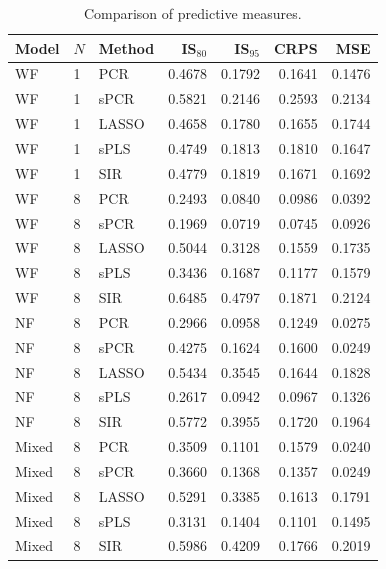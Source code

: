 \documentclass[12pt]{amsart}
\theoremstyle{plain}
\theoremstyle{definition}
\theoremstyle{remark}
\begin{document}
\begin{table}
\centering
\begin{tabular}{lll|rrr|r}
  \toprule
  \textbf{Model} & $N$ & \textbf{Method} & IS$_{80}$ & IS$_{95}$ & CRPS & MSE \\ 
  \midrule
  WF & 1 & PCR & 0.4678 & 0.1792 & 0.1641 & 0.1476 \\ 
  WF & 1 & sPCR & 0.5821 & 0.2146 & 0.2593 & 0.2134 \\ 
  WF & 1 & LASSO & 0.4658 & 0.1780 & 0.1655 & 0.1744 \\ 
  WF & 1 & sPLS & 0.4749 & 0.1813 & 0.1810 & 0.1647 \\ 
  WF & 1 & SIR & 0.4779 & 0.1819 & 0.1671 & 0.1692 \\
  \midrule
  WF & 8 & PCR & 0.2493 & 0.0840 & 0.0986 & 0.0392 \\ 
  WF & 8 & sPCR & 0.1969 & 0.0719 & 0.0745 & 0.0926 \\ 
  WF & 8 & LASSO & 0.5044 & 0.3128 & 0.1559 & 0.1735 \\ 
  WF & 8 & sPLS & 0.3436 & 0.1687 & 0.1177 & 0.1579 \\ 
  WF & 8 & SIR & 0.6485 & 0.4797 & 0.1871 & 0.2124 \\
  \midrule
  NF & 8 & PCR & 0.2966 & 0.0958 & 0.1249 & 0.0275 \\ 
  NF & 8 & sPCR & 0.4275 & 0.1624 & 0.1600 & 0.0249 \\ 
  NF & 8 & LASSO & 0.5434 & 0.3545 & 0.1644 & 0.1828 \\ 
  NF & 8 & sPLS & 0.2617 & 0.0942 & 0.0967 & 0.1326 \\ 
  NF & 8 & SIR & 0.5772 & 0.3955 & 0.1720 & 0.1964 \\
  \midrule
  Mixed & 8 & PCR & 0.3509 & 0.1101 & 0.1579 & 0.0240 \\ 
  Mixed & 8 & sPCR & 0.3660 & 0.1368 & 0.1357 & 0.0249 \\ 
  Mixed & 8 & LASSO & 0.5291 & 0.3385 & 0.1613 & 0.1791 \\ 
  Mixed & 8 & sPLS & 0.3131 & 0.1404 & 0.1101 & 0.1495 \\ 
  Mixed & 8 & SIR & 0.5986 & 0.4209 & 0.1766 & 0.2019 \\ 
   \bottomrule
\end{tabular}
\caption{Comparison of predictive measures.}
\label{tab:comparisontot}
\end{table}
\end{document}
